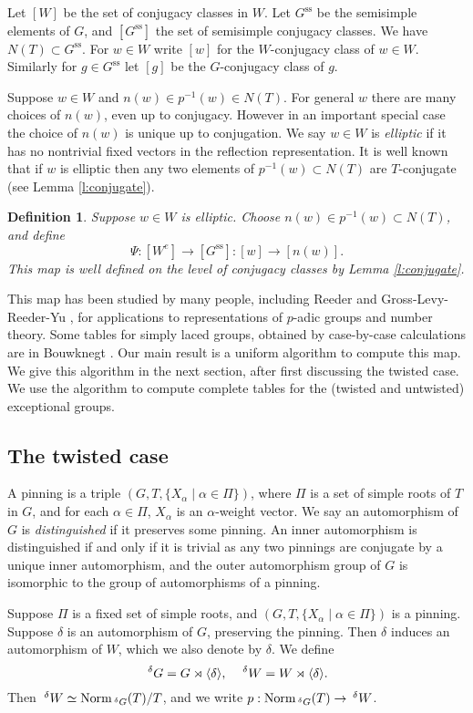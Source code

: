 \documentclass[10pt,leqno]{article}
\newtheorem{definition}[equation]{Definition}
\newcommand{\Norm}{\text{Norm}}
\newcommand{\subsec}[1]{\subsection{#1}
\renewcommand{\theequation}{\thesubsection.\arabic{equation}}}
\newcommand\inv{^{-1}}
\newcommand{\Wconj}{[W]}
\newcommand{\Weconj}{[{W^e}]}
\newcommand{\Gssconj}{[{G^\text{ss}}]}
\renewcommand{\ss}{\text{ss}}
\newcommand{\Gss}{G^\ss}
\newcommand{\Wext}{\negthinspace\negthinspace\phantom{a}^\delta W}
\newcommand{\Gext}{\negthinspace\negthinspace\phantom{a}^\delta G}
\begin{document}
Let $\Wconj$ be the set of conjugacy classes in $W$. Let $\Gss$ be the
semisimple elements of $G$, and $\Gssconj$ the set of semisimple
conjugacy classes. We have $N(T)\subset \Gss$. For $w\in W$ write $[w]$ for the $W$-conjugacy
class of $w\in W$. Similarly for $g\in \Gss$ let $[g]$ be the
$G$-conjugacy class of $g$.

Suppose $w\in W$ and $n(w)\in p\inv(w)\in N(T)$. For general $w$ there
are many choices of $n(w)$, even up to conjugacy.  However in an
important special case the choice of $n(w)$ is unique up to
conjugation. We say $w\in W$ is {\it elliptic} if it has no nontrivial fixed
vectors in the reflection representation.  It is well known that if
$w$ is elliptic then any two elements of $p\inv(w)\subset N(T)$ are
$T$-conjugate (see Lemma \ref{l:conjugate}).

\begin{definition}
\label{d:basic}
Suppose $w\in W$ is elliptic.
Choose $n(w)\in p\inv(w)\subset N(T)$, and define
$$
\Psi: \Weconj\rightarrow\Gssconj: [w]\rightarrow [n(w)].
$$
This map is well defined on the level of conjugacy classes by Lemma \ref{l:conjugate}.
\end{definition}

This map has been studied by many people, including Reeder
\cite{reeder_torsion} and Gross-Levy-Reeder-Yu \cite{rgly}, for
applications to representations of $p$-adic groups and number theory.
Some tables for simply laced groups, obtained by case-by-case
calculations are in Bouwknegt \cite{bouwknegt}.  Our main result is a
uniform algorithm to compute this map. We give this algorithm in the
next section, after first discussing the twisted case. We use the
algorithm to compute complete tables for the (twisted and untwisted) exceptional
groups.

\subsec{The twisted case}
\label{s:twisted}

A pinning is a triple $(G,T,\{X_\alpha\mid \alpha\in\Pi\})$,
where $\Pi$ is a set of simple roots of $T$ in $G$, and for each
$\alpha\in\Pi$, $X_\alpha$ is an $\alpha$-weight vector.  
We say an automorphism of $G$ is {\it distinguished} if it preserves some pinning.  An
inner automorphism is distinguished if and only if it is trivial as
any two pinnings are conjugate by a unique inner automorphism,
and the
outer automorphism group of $G$ is isomorphic to the group of
automorphisms of a pinning.

Suppose $\Pi$ is a fixed set of simple roots, and
$(G,T,\{X_\alpha\mid\alpha\in\Pi\})$ is a pinning.
Suppose $\delta$ is an automorphism of $G$, preserving
the pinning.
Then $\delta$ induces an
automorphism of $W$, which we also denote by $\delta$. We define
$$
\Gext=G \rtimes\langle\delta\rangle, \quad \Wext=W\rtimes\langle\delta\rangle.
$$
Then $\Wext\simeq \Norm_{\Gext}(T)/T$, and we write $p:\Norm_{\Gext}(T)\rightarrow \Wext$.
\end{document}
